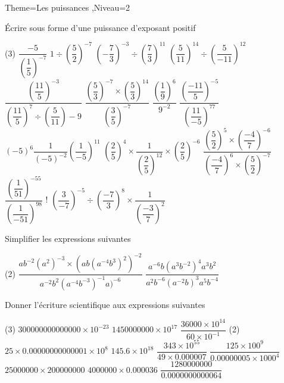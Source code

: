 \documentclass[a4paper,12pt]{article}
\begin{document}
\begin{Maquette}[Fiche]{Theme=Les puissances ,Niveau=2}
\begin{exercice}
\'Ecrire sous forme d'une puissance d'exposant positif
\begin{tasks}(3)
\task $\dfrac{-5}{\left(\dfrac{1}{5} \right)^{-7}} $
\task $1\div\left( \dfrac{5}{2}\right)^{-7} $
\task $\left( -\dfrac{7}{3}\right)^{-3}\div\left(\dfrac{7}{3} \right)^{11}$
\task $\left( \dfrac{5}{11}\right)^{14}\div\left(\dfrac{5}{-11} \right)^{12}$
\task $\dfrac{\left(\dfrac{11}{5} \right)^{-3}}{\left( \dfrac{11}{5}\right)^{7}\div\left(\dfrac{5}{11} \right)-9} $
\task $\dfrac{\left(\dfrac{5}{3} \right)^{-7}\times\left(\dfrac{5}{3} \right)^{14}}{\left(\dfrac{3}{5} \right)^{-7}}$
\task $\dfrac{\left(\dfrac{1}{9} \right)^{6}}{9^{-2}} $
\task $\dfrac{\left( \dfrac{-11}{5}\right)^{-5}}{\left( \dfrac{11}{-5}\right)^{77}} $
\task $(-5)^{6}\dfrac{1}{(-5)^{-2}}\left(\dfrac{1}{-5}\right)^{11}$
\task $\left(\dfrac{2}{5} \right)^{4}\times\dfrac{1}{\left(\dfrac{2}{5} \right)^{12}}\times\left( \dfrac{2}{5}\right)^{-6}$
\task $\dfrac{\left(\dfrac{5}{2} \right)^{5}\times\left(\dfrac{-4}{7} \right)^{-6}}{\left(\dfrac{-4}{7} \right)^{6}\times\left(\dfrac{5}{2} \right)^{-7}}$ 
\task $\dfrac{\left( \dfrac{1}{51}\right)^{-55}}{\left( \dfrac{1}{-51}\right)^{98}} $
\task! $\left(\dfrac{3}{-7} \right)^{-5}\div\left(\dfrac{-7}{3} \right)^{8}\times\dfrac{1}{\left( \dfrac{-3}{7}\right)^{2}}$
\end{tasks}
\end{exercice}

\begin{exercice}
Simplifier les expressions suivantes
\begin{tasks}(2)
\task $\dfrac{ab^{-2}(a^{2})^{-3}\times\left(ab(a^{-4}b^{3})^{2}\right)^{-2}}{a^{-2}b^{2}(a^{-4}b^{-3})^{-1}a)^{-6}} $ 
\task $\dfrac{a^{-6}b(a^{3}b^{-2})^{4}a^{3}b^{2}}{a^{2}b^{-6}(a^{-2}b)^{3}a^{5}b^{-4}} $
\end{tasks}
\end{exercice}

\begin{exercice}
Donner l'écriture scientifique aux expressions suivantes
\begin{tasks}(3)
\task $300000000000000\times 10^{-23}$
\task $1450000000\times 10^{17}$ 
\task $\dfrac{36000\times 10^{14}}{60\times 10^{-1}}$
\task*(2) $25\times 0.00000000000001 \times 10^{8}$
\task $145.6\times 10^{18}$
\task $\dfrac{343\times 10^{55}}{49\times 0.000007}$
\task $\dfrac{125\times 100^{9}}{0.00000005\times 1000^{4}}$
\task $25000000\times 200000000$
\task $4000000\times 0.000036$
\task $\dfrac{1280000000}{0.0000000000064}$
\end{tasks} 
\end{exercice}


\end{Maquette}
\end{document}
